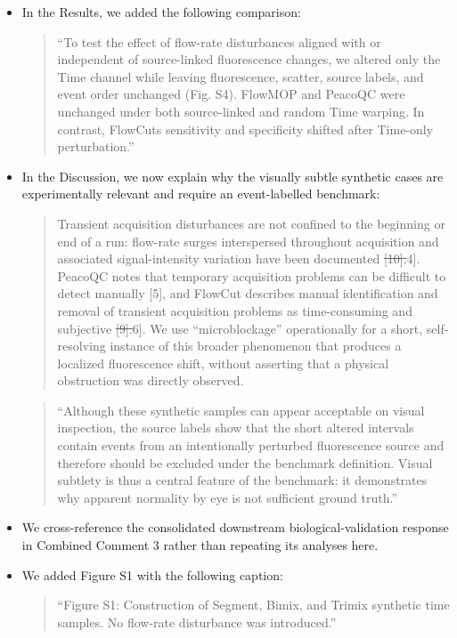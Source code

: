 \documentclass[
  11pt,
  a4paper,
]{article}
\begin{document}
\begin{itemize}
\item
  In the Results, we added the following comparison:

  \begin{quote}
  ``To test the effect of flow-rate disturbances aligned with or
  independent of source-linked fluorescence changes, we altered only the
  Time channel while leaving fluorescence, scatter, source labels, and
  event order unchanged (Fig. S4). FlowMOP and PeacoQC were unchanged
  under both source-linked and random Time warping. In contrast,
  FlowCut\textquotesingle s sensitivity and specificity shifted after
  Time-only perturbation.''
  \end{quote}
\item
  In the Discussion, we now explain why the visually subtle synthetic
  cases are experimentally relevant and require an event-labelled
  benchmark:

  \begin{quote}
  Transient acquisition disturbances are not confined to the beginning
  or end of a run: flow-rate surges interspersed throughout acquisition
  and associated signal-intensity variation have been documented
  {\color{revisionred}\sout{{[}10{]}.}}{\color{revisionblue}{[}4{]}.}
  PeacoQC notes that temporary acquisition problems can be difficult to
  detect manually {[}5{]}, and FlowCut describes manual identification
  and removal of transient acquisition problems as time-consuming and
  subjective
  {\color{revisionred}\sout{{[}9{]}.}}{\color{revisionblue}{[}6{]}.} We
  use ``microblockage'' operationally for a short, self-resolving
  instance of this broader phenomenon that produces a localized
  fluorescence shift, without asserting that a physical obstruction was
  directly observed.
  \end{quote}

  \begin{quote}
  ``Although these synthetic samples can appear acceptable on visual
  inspection, the source labels show that the short altered intervals
  contain events from an intentionally perturbed fluorescence source and
  therefore should be excluded under the benchmark definition. Visual
  subtlety is thus a central feature of the benchmark: it demonstrates
  why apparent normality by eye is not sufficient ground truth.''
  \end{quote}
\item
  We cross-reference the consolidated downstream biological-validation
  response in Combined Comment 3 rather than repeating its analyses
  here.
\item
  We added Figure S1 with the following caption:

  \begin{quote}
  ``Figure S1: Construction of Segment, Bimix, and Trimix synthetic time
  samples. No flow-rate disturbance was introduced.''
  \end{quote}
\end{itemize}
\end{document}
